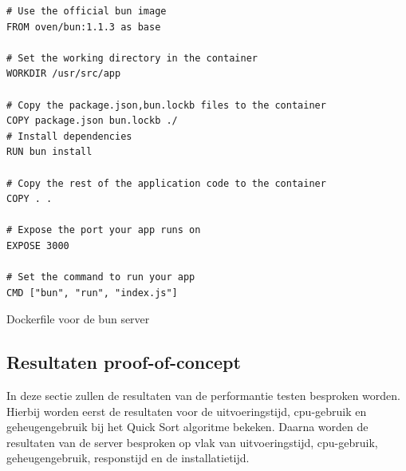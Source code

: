 \begin{listing}[H]
  \centering
  \begin{verbatim}
# Use the official bun image
FROM oven/bun:1.1.3 as base

# Set the working directory in the container
WORKDIR /usr/src/app

# Copy the package.json,bun.lockb files to the container
COPY package.json bun.lockb ./
# Install dependencies
RUN bun install

# Copy the rest of the application code to the container
COPY . .

# Expose the port your app runs on
EXPOSE 3000

# Set the command to run your app
CMD ["bun", "run", "index.js"]
      \end{verbatim}
      \caption{\label{code:dockerbun}Dockerfile voor de bun server}
\end{listing}

\subsection{Resultaten proof-of-concept}
In deze sectie zullen de resultaten van de performantie testen besproken worden.
Hierbij worden eerst de resultaten voor de uitvoeringstijd, cpu-gebruik en geheugengebruik bij het Quick Sort algoritme bekeken.
Daarna worden de resultaten van de server besproken op vlak van uitvoeringstijd, cpu-gebruik, geheugengebruik, responstijd en de installatietijd.

